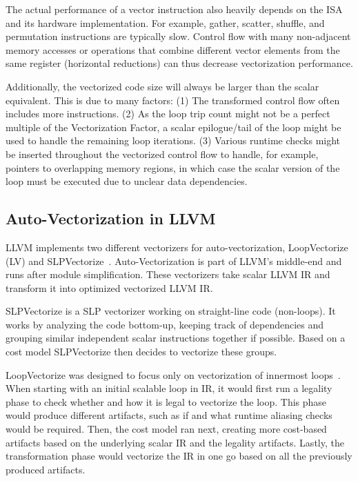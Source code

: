 \documentclass[sigplan,11pt,nonacm]{acmart}
\begin{document}
The actual performance of a vector instruction also heavily depends on the ISA and its 
hardware implementation. 
For example, gather, scatter, 
shuffle, and permutation instructions are typically slow. Control flow with many 
non-adjacent memory accesses or 
operations that combine different vector elements from the same register (horizontal reductions) can thus 
decrease vectorization performance.

Additionally, the vectorized code size will always be larger than the scalar equivalent. This is
due to many factors: (1) The transformed control flow often includes more instructions.
(2) As the loop trip count might not be a perfect multiple of the Vectorization Factor, a scalar
epilogue/tail of the loop might be used to handle the remaining loop iterations. (3) Various runtime
checks might be inserted throughout the vectorized control flow to handle, for example, pointers 
to overlapping memory regions, in which case the scalar version of the loop must be executed due to 
unclear data dependencies.

\subsection{Auto-Vectorization in LLVM}
LLVM implements two different vectorizers for auto-vectorization, LoopVectorize (LV)
and SLPVectorize~\cite{llvmvec,llvmhistorystate}. Auto-Vectorization is part of LLVM's 
middle-end and runs after module simplification.
These vectorizers take scalar LLVM IR and transform it into optimized vectorized 
LLVM IR.

SLPVectorize is a SLP vectorizer working on straight-line code (non-loops). It works by analyzing
the code bottom-up, keeping track of dependencies and grouping similar independent scalar instructions
together if possible. Based on a cost model SLPVectorize then decides to vectorize these groups.

LoopVectorize was designed to focus only on vectorization of innermost loops~\cite{llvmintrvplan}. 
When starting with an initial scalable loop in IR, it would first run a legality phase to check 
whether and how it is legal to vectorize the loop. This phase would produce different artifacts, 
such as if 
and what runtime aliasing checks would be required. Then, the cost model ran next, creating more 
cost-based artifacts based on the underlying scalar IR and the legality artifacts. 
Lastly, the transformation phase would vectorize 
the IR in one go based on all the previously produced artifacts.
\end{document}

